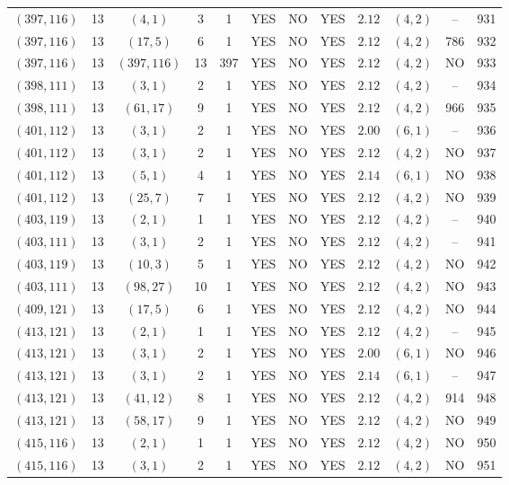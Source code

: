 \begin{longtable}{|c|c|c|c|c|c|c|c|c|c|c|c|}
$(397,116)$ & 13 & $(4,1)$ & 3 & 1 & YES & NO & YES & $2.12$ & $(4,2)$ & -- & 931\\
$(397,116)$ & 13 & $(17,5)$ & 6 & 1 & YES & NO & YES & $2.12$ & $(4,2)$ & 786 & 932\\
$(397,116)$ & 13 & $(397,116)$ & 13 & 397 & YES & NO & YES & $2.12$ & $(4,2)$ & NO & 933\\
$(398,111)$ & 13 & $(3,1)$ & 2 & 1 & YES & NO & YES & $2.12$ & $(4,2)$ & -- & 934\\
$(398,111)$ & 13 & $(61,17)$ & 9 & 1 & YES & NO & YES & $2.12$ & $(4,2)$ & 966 & 935\\
$(401,112)$ & 13 & $(3,1)$ & 2 & 1 & YES & NO & YES & $2.00$ & $(6,1)$ & -- & 936\\
$(401,112)$ & 13 & $(3,1)$ & 2 & 1 & YES & NO & YES & $2.12$ & $(4,2)$ & NO & 937\\
$(401,112)$ & 13 & $(5,1)$ & 4 & 1 & YES & NO & YES & $2.14$ & $(6,1)$ & NO & 938\\
$(401,112)$ & 13 & $(25,7)$ & 7 & 1 & YES & NO & YES & $2.12$ & $(4,2)$ & NO & 939\\
$(403,119)$ & 13 & $(2,1)$ & 1 & 1 & YES & NO & YES & $2.12$ & $(4,2)$ & -- & 940\\
$(403,111)$ & 13 & $(3,1)$ & 2 & 1 & YES & NO & YES & $2.12$ & $(4,2)$ & -- & 941\\
$(403,119)$ & 13 & $(10,3)$ & 5 & 1 & YES & NO & YES & $2.12$ & $(4,2)$ & NO & 942\\
$(403,111)$ & 13 & $(98,27)$ & 10 & 1 & YES & NO & YES & $2.12$ & $(4,2)$ & NO & 943\\
$(409,121)$ & 13 & $(17,5)$ & 6 & 1 & YES & NO & YES & $2.12$ & $(4,2)$ & NO & 944\\
$(413,121)$ & 13 & $(2,1)$ & 1 & 1 & YES & NO & YES & $2.12$ & $(4,2)$ & -- & 945\\
$(413,121)$ & 13 & $(3,1)$ & 2 & 1 & YES & NO & YES & $2.00$ & $(6,1)$ & NO & 946\\
$(413,121)$ & 13 & $(3,1)$ & 2 & 1 & YES & NO & YES & $2.14$ & $(6,1)$ & -- & 947\\
$(413,121)$ & 13 & $(41,12)$ & 8 & 1 & YES & NO & YES & $2.12$ & $(4,2)$ & 914 & 948\\
$(413,121)$ & 13 & $(58,17)$ & 9 & 1 & YES & NO & YES & $2.12$ & $(4,2)$ & NO & 949\\
$(415,116)$ & 13 & $(2,1)$ & 1 & 1 & YES & NO & YES & $2.12$ & $(4,2)$ & NO & 950\\
$(415,116)$ & 13 & $(3,1)$ & 2 & 1 & YES & NO & YES & $2.12$ & $(4,2)$ & NO & 951\\

\end{longtable}

